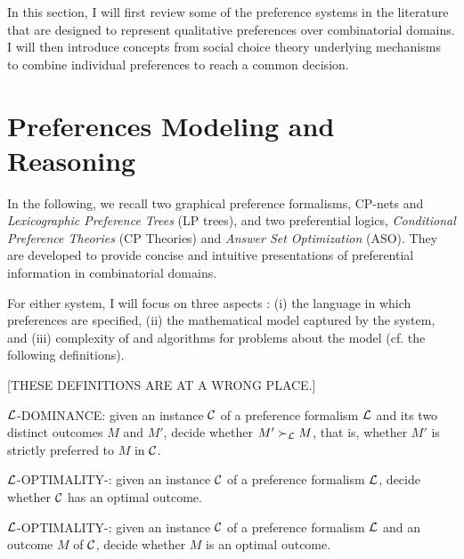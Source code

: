 
In this section, I will first review some of the preference
systems in the literature that are designed to represent
qualitative preferences over combinatorial domains. 
I will then introduce concepts
from social choice theory underlying mechanisms to
combine individual preferences to reach a common decision.

\section{Preferences Modeling and Reasoning \label{sec:pref_reasoning}}
In the following, we recall two graphical
preference formalisms, CP-nets and
\textit{Lexicographic Preference Trees} (LP trees),
and two preferential logics,
\textit{Conditional Preference Theories} (CP Theories)
and \textit{Answer Set Optimization} (ASO).
They are developed to provide concise and intuitive
presentations of preferential information in 
combinatorial domains.

For either system, I will focus on three aspects \cite{Domshlak20111037}:
(i) the language in which preferences are specified,
(ii) the mathematical model captured by the system,
and (iii) complexity of and algorithms for
problems about the model (cf. the following definitions).

[THESE DEFINITIONS ARE AT A WRONG PLACE.]
\begin{definition}
\label{def:dom}
  $\mathcal{L}$-DOMINANCE: given an instance $\mathcal{C}$ of a preference
	formalism $\mathcal{L}$ and its two distinct outcomes
  $M$ and $M'$, decide whether $M' \succ_{\mathcal{L}} M$, that is,
  whether $M'$ is strictly preferred to $M$ in $\mathcal{C}$.
\end{definition}

\begin{definition}
\label{def:opt1}
  $\mathcal{L}$-OPTIMALITY-: given an instance $\mathcal{C}$ of a preference
	formalism $\mathcal{L}$,
  decide whether $\mathcal{C}$ has an optimal outcome.
\end{definition}

\begin{definition}
\label{def:opt2}
  $\mathcal{L}$-OPTIMALITY-: given an instance $\mathcal{C}$ of a preference
	formalism $\mathcal{L}$ and an outcome $M$ of $\mathcal{C}$,
  decide whether $M$ is an optimal outcome.
\end{definition}

